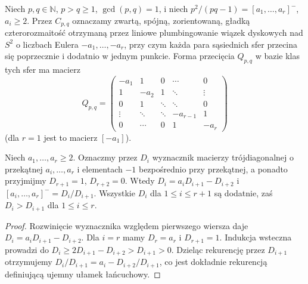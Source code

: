 \begin{definicja}[Konfiguracja $C_{p,q}$]
Niech $p,q\in\mathbb N$, $p>q\geq1$, $\gcd(p,q)=1$, i niech
$p^2/(pq-1)=[a_1,\ldots,a_r]^-$, $a_i\geq2$.
Przez $C_{p,q}$ oznaczamy zwartą, spójną, zorientowaną,
gładką czterorozmaitość otrzymaną przez liniowe plumbingowanie
wiązek dyskowych nad $S^2$ o liczbach Eulera
$-a_1,\ldots,-a_r$, przy czym każda para sąsiednich sfer
przecina się poprzecznie i dodatnio w jednym punkcie.
Forma przecięcia $Q_{p,q}$ w bazie klas tych sfer ma macierz
\[
Q_{p,q}=\begin{pmatrix}
-a_1&1&0&\cdots&0\\
1&-a_2&1&\ddots&\vdots\\
0&1&\ddots&\ddots&0\\
\vdots&\ddots&\ddots&-a_{r-1}&1\\
0&\cdots&0&1&-a_r
\end{pmatrix}
\]
(dla $r=1$ jest to macierz $[-a_1]$).
\end{definicja}

\begin{center}
\end{center}

\begin{lemat}
\label{lem:tg-general-minors}
Niech $a_1,\ldots,a_r\geq2$. Oznaczmy przez $D_i$ wyznacznik
macierzy trójdiagonalnej o przekątnej
$a_i,\ldots,a_r$ i elementach $-1$ bezpośrednio przy przekątnej,
a ponadto przyjmijmy $D_{r+1}=1$, $D_{r+2}=0$. Wtedy
$D_i=a_iD_{i+1}-D_{i+2}$ i
$[a_i,\ldots,a_r]^-=D_i/D_{i+1}$. Wszystkie $D_i$ dla
$1\leq i\leq r+1$ są dodatnie, zaś $D_i>D_{i+1}$ dla
$1\leq i\leq r$.
\end{lemat}

\begin{proof}
Rozwinięcie wyznacznika względem pierwszego wiersza daje
$D_i=a_iD_{i+1}-D_{i+2}$. Dla $i=r$ mamy $D_r=a_r$ i
$D_{r+1}=1$. Indukcja wsteczna prowadzi do
$D_i\geq2D_{i+1}-D_{i+2}>D_{i+1}>0$.
Dzieląc rekurencję przez $D_{i+1}$ otrzymujemy
$D_i/D_{i+1}=a_i-D_{i+2}/D_{i+1}$, co jest dokładnie
rekurencją definiującą ujemny ułamek łańcuchowy.
\end{proof}


